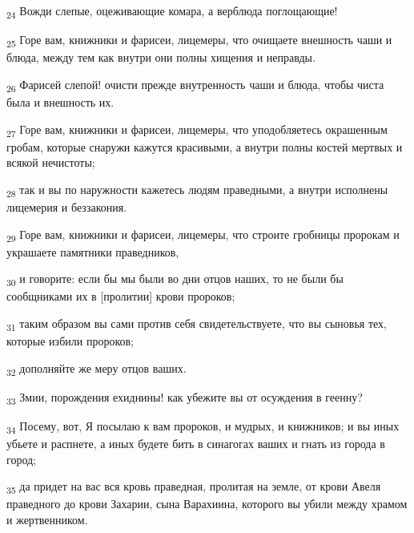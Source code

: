 \begin{tcolorbox}
\textsubscript{24} Вожди слепые, оцеживающие комара, а верблюда поглощающие!
\end{tcolorbox}
\begin{tcolorbox}
\textsubscript{25} Горе вам, книжники и фарисеи, лицемеры, что очищаете внешность чаши и блюда, между тем как внутри они полны хищения и неправды.
\end{tcolorbox}
\begin{tcolorbox}
\textsubscript{26} Фарисей слепой! очисти прежде внутренность чаши и блюда, чтобы чиста была и внешность их.
\end{tcolorbox}
\begin{tcolorbox}
\textsubscript{27} Горе вам, книжники и фарисеи, лицемеры, что уподобляетесь окрашенным гробам, которые снаружи кажутся красивыми, а внутри полны костей мертвых и всякой нечистоты;
\end{tcolorbox}
\begin{tcolorbox}
\textsubscript{28} так и вы по наружности кажетесь людям праведными, а внутри исполнены лицемерия и беззакония.
\end{tcolorbox}
\begin{tcolorbox}
\textsubscript{29} Горе вам, книжники и фарисеи, лицемеры, что строите гробницы пророкам и украшаете памятники праведников,
\end{tcolorbox}
\begin{tcolorbox}
\textsubscript{30} и говорите: если бы мы были во дни отцов наших, то не были бы сообщниками их в [пролитии] крови пророков;
\end{tcolorbox}
\begin{tcolorbox}
\textsubscript{31} таким образом вы сами против себя свидетельствуете, что вы сыновья тех, которые избили пророков;
\end{tcolorbox}
\begin{tcolorbox}
\textsubscript{32} дополняйте же меру отцов ваших.
\end{tcolorbox}
\begin{tcolorbox}
\textsubscript{33} Змии, порождения ехиднины! как убежите вы от осуждения в геенну?
\end{tcolorbox}
\begin{tcolorbox}
\textsubscript{34} Посему, вот, Я посылаю к вам пророков, и мудрых, и книжников; и вы иных убьете и распнете, а иных будете бить в синагогах ваших и гнать из города в город;
\end{tcolorbox}
\begin{tcolorbox}
\textsubscript{35} да придет на вас вся кровь праведная, пролитая на земле, от крови Авеля праведного до крови Захарии, сына Варахиина, которого вы убили между храмом и жертвенником.
\end{tcolorbox}
